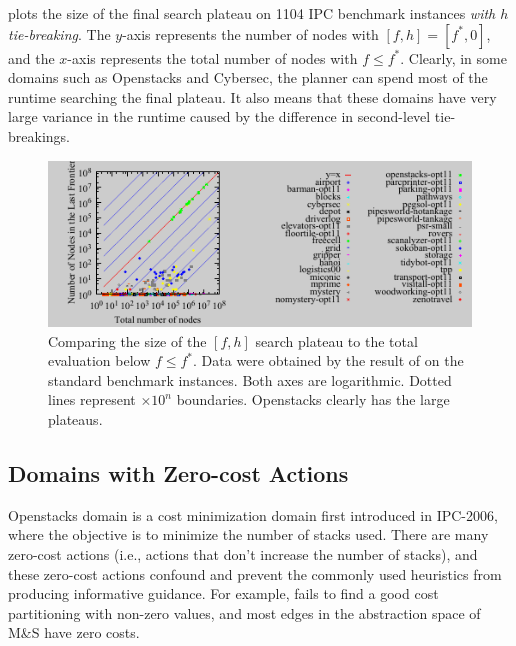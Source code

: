  plots the size of the final search plateau on 1104 IPC
benchmark instances \emph{with $h$ tie-breaking}.
The $y$-axis
represents the number of nodes with $[f,h]=[f^*,0]$, and the $x$-axis represents the total
number of nodes with $f\leq f^*$.
Clearly, in some domains such as Openstacks and Cybersec, the planner can spend most of the runtime
searching the final plateau.
It also
means that these domains have very large variance in the runtime caused
by the difference in second-level tie-breakings. 




\begin{figure}[tb]
 \centering {}
  \includegraphics{tables/aaai16-frontier/aaai16prelim3/lmcut_frontier-front.pdf}
  \caption{Comparing the size of the $[f,h]$ search plateau to the total
  evaluation below $f\leq f^*$. Data were obtained by the result of
  \lmcut on the standard benchmark instances. Both axes are
  logarithmic. Dotted lines represent $\times 10^n$ boundaries.
  Openstacks clearly has the large plateaus.}  \label{plateau}
\end{figure}

\subsection{Domains with Zero-cost Actions}

Openstacks domain is a cost
minimization domain first introduced in IPC-2006, where the objective is to 
minimize the number of stacks used.
There are many zero-cost actions (i.e., actions that don't increase the number of stacks), and
these zero-cost actions confound and prevent the commonly used heuristics from producing
informative guidance.
For example, \lmcut \cite{Helmert2009} fails to find a good cost
partitioning with non-zero values, 
and most edges in the abstraction
space of M\&S \cite{helmert2007flexible} have zero costs.

